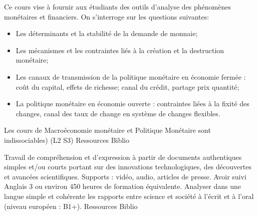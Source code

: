 \documentclass[10pt, a5paper]{report}
\begin{document}
{
Ce cours vise à fournir aux étudiants des outils d'analyse des phénomènes monétaires et financiers.
On s'interroge sur les questions suivantes:
\begin{itemize}
\item Les déterminants et la stabilité de la demande de monnaie;
\item Les mécanismes et les contraintes liés à la création et la destruction monétaire;
\item Les canaux de transmission de la politique monétaire en économie fermée : coût du capital, effets de richesse; canal du crédit, partage prix quantité;
\item La politique monétaire en économie ouverte : contraintes liées à la fixité des changes, canal des taux de change en système de changes flexibles.
\end{itemize}
}
{Les cours de Macroéconomie monétaire et Politique Monétaire sont indissociables) (L2 S3)}
{}
{Ressources}
{Biblio}
 
\vfill



{Travail de compréhension et d'expression à partir de documents authentiques simples et/ou courts portant sur des innovations technologiques, des découvertes et avancées scientifiques. Supports : vidéo, audio, articles de presse.}
{Avoir suivi Anglais 3 ou environ 450 heures de formation équivalente.}
{Analyser dans une langue simple et cohérente les rapports entre science et société à l'écrit et à l'oral (niveau européen : B1+).}
{Ressources}
{Biblio}
\end{document}
